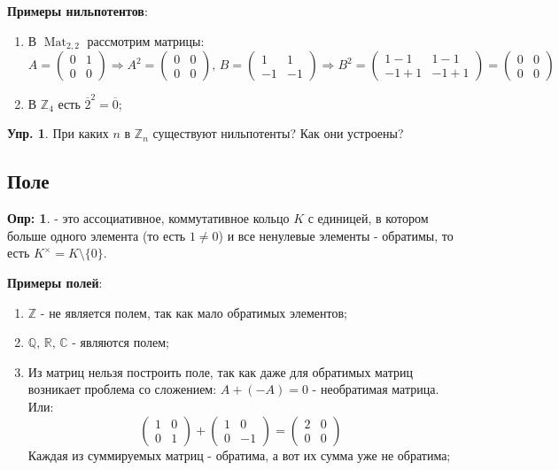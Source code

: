 \documentclass[12pt]{article}
\newcommand{\MR}{\mathbb{R}}
\newcommand{\MC}{\mathbb{C}}
\newcommand{\MQ}{\mathbb{Q}}
\newcommand{\MZ}{\mathbb{Z}}
\theoremstyle{definition}
\newtheorem{defn}{Опр:}
\newtheorem{exrc}{Упр.}
\newcommand{\mat}[2]{\operatorname{Mat}_{#1, #2}}
\begin{document}
\textbf{Примеры нильпотентов}:
\begin{enumerate}[label=\arabic*)]
	\item В $\mat{2}{2}$ рассмотрим матрицы:
	$$
		A = 
		\begin{pmatrix}
			0 & 1 \\
			0 & 0
		\end{pmatrix} \Rightarrow A^2 = 
		\begin{pmatrix}
			0 & 0\\
			0 & 0
		\end{pmatrix}, \, 
		B = \begin{pmatrix}
			1 & 1 \\
			-1 & -1
		\end{pmatrix} \Rightarrow
		B^2 = 
		\begin{pmatrix}
			1 - 1 & 1 - 1\\
			-1 + 1& -1 + 1
		\end{pmatrix} = 
		\begin{pmatrix}
			0 & 0\\
			0 & 0
		\end{pmatrix}
	$$
	\item В $\MZ_4$ есть $\overline{2}^2 = \overline{0}$;
\end{enumerate}
\begin{exrc}
	При каких $n$ в $\MZ_n$ существуют нильпотенты? Как они устроены? 
\end{exrc}

\newpage
\subsection*{Поле}

\begin{defn}
	 - это ассоциативное, коммутативное кольцо $K$ с единицей, в котором больше одного элемента (то есть $1 \neq 0$) и все ненулевые элементы - обратимы, то есть $K^{\times} = K \setminus \{0\}$.
\end{defn}

\textbf{Примеры полей}:
\begin{enumerate}[label=\arabic*)]
	\item $\MZ$ - не является полем, так как мало обратимых элементов;
	\item $\MQ, \, \MR, \, \MC$ - являются полем;
	\item Из матриц нельзя построить поле, так как даже для обратимых матриц возникает проблема со сложением: $A + (-A) = 0$ - необратимая матрица. Или:
	$$
		\begin{pmatrix}
			1 & 0 \\
			0 & 1
		\end{pmatrix} + 
		\begin{pmatrix}
			1 & 0 \\
			0 & -1
		\end{pmatrix}= 
		\begin{pmatrix}
			2 & 0\\
			0 & 0
		\end{pmatrix}
	$$
	Каждая из суммируемых матриц - обратима, а вот их сумма уже не обратима;
\end{enumerate}
\end{document}
